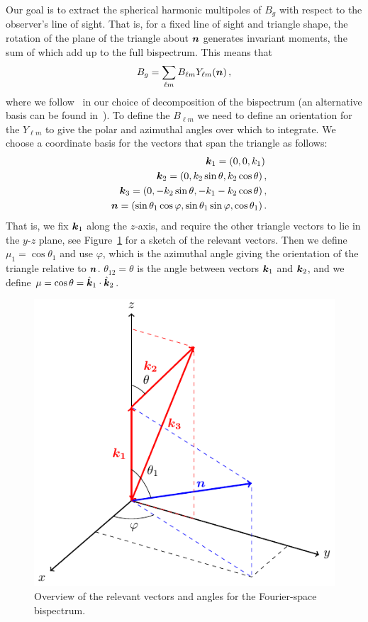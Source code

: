 Our goal is to extract the spherical harmonic multipoles of $B_g$ with respect to the observer's line of sight. That is, for a fixed line of sight and triangle shape, the rotation of the plane of the triangle about $\bm {n}$ generates invariant moments, the sum of which add up to the full bispectrum. 
 This means that  
\begin{equation}
B_g =\sum_{\ell m} B_{\ell m}Y_{\ell m}(\bm {n})\,,
\end{equation}
where we follow~\cite{Scoccimarro:1999ed,Nan:2017oaq} in our choice of decomposition of the bispectrum (an alternative basis can be found in~\cite{Sugiyama:2018yzo}).
To define the $B_{\ell m}$ we need to define an orientation for the $Y_{\ell m}$ to give the polar and azimuthal angles over which to integrate. We choose a coordinate basis for the vectors that span the triangle as follows: 
\begin{eqnarray}
	&&\bm {k}_1 = (0,0,k_1)\, \\
	&&\bm {k}_2 = (0, k_2 \sin\theta, k_2 \cos\theta)\,, \\
	&&\bm {k}_3 = (0, - k_2 \sin\theta, - k_1 - k_2\cos\theta )\,,\\
	&&\bm{n} = (\sin\theta_1 \cos\varphi, \sin\theta_1 \sin\varphi,\cos\theta_1)\,.
\end{eqnarray}
That is, we fix $\bm {k}_1$ along the $z$-axis, and require the other triangle vectors to lie in the $y$-$z$ plane, see Figure~\ref{fig:geometry_overview} for a sketch of the relevant vectors. Then we define {\(\mu_1=\cos\theta_1\)} and use $\varphi$, which is the azimuthal angle giving the orientation of the triangle relative to $\bm {n}$. \(\theta_{12} = \theta\) is the angle between vectors \(\bm {k}_1\) and \(\bm {k}_2\), and we define $\mu=\cos\theta=\hat{\bm {k}}_1\cdot\hat{\bm {k}}_2$.
\begin{figure}[ht]
	\centering
	\includegraphics[width=0.6
	\linewidth]{fig/fig.pdf}
	\caption{Overview of the relevant vectors and angles for the Fourier-space bispectrum. \label{fig:geometry_overview} }
\end{figure}

